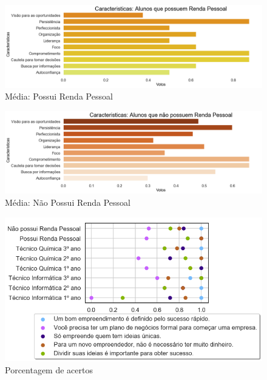 \begin{figure}[!h]
    \centering
    \includegraphics[width=1.0\textwidth]{img/caractRenda.png}
    \caption{Média: Possui Renda Pessoal}
    \label{fig:pRenda}
\end{figure}

\begin{figure}[!h]
    \centering
    \includegraphics[width=1.0\textwidth]{img/caractNRenda.png}
    \caption{Média: Não Possui Renda Pessoal}
    \label{fig:npRenda}
\end{figure}

\begin{figure}[!h]
    \centering
    \includegraphics[width=1.0\textwidth]{img/respMV.png}
    \caption{Porcentagem de acertos}
    \label{fig:acertos}
\end{figure}